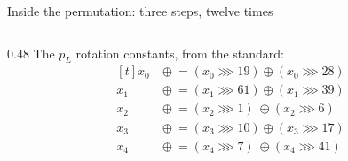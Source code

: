 \documentclass[aspectratio=169,11pt]{beamer}
\begin{document}
\begin{frame}{Inside the permutation: three steps, twelve times}
\begin{columns}[T]
\begin{column}{0.48\textwidth}
\vspace{1mm}
{\footnotesize The $p_L$ rotation constants, from the standard:}
{\scriptsize
\[\begin{aligned}[t]
x_0 &\mathrel{\oplus}= (x_0\!\ggg\!19)\oplus(x_0\!\ggg\!28)\\[-0.8mm]
x_1 &\mathrel{\oplus}= (x_1\!\ggg\!61)\oplus(x_1\!\ggg\!39)\\[-0.8mm]
x_2 &\mathrel{\oplus}= (x_2\!\ggg\!1)\ \oplus(x_2\!\ggg\!6)\\[-0.8mm]
x_3 &\mathrel{\oplus}= (x_3\!\ggg\!10)\oplus(x_3\!\ggg\!17)\\[-0.8mm]
x_4 &\mathrel{\oplus}= (x_4\!\ggg\!7)\ \oplus(x_4\!\ggg\!41)
\end{aligned}\]}
\end{column}
\end{columns}
\end{frame}
\end{document}
